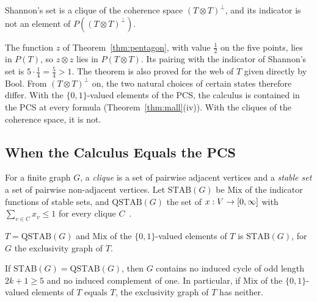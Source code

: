 \begin{theorem}
\label{thm:shannon}
Shannon's set is a clique of the coherence space $(T \otimes T)^{\perp}$,
and its indicator is not an element of $P((T \otimes T)^{\perp})$.
\end{theorem}

\noindent
The function $z$ of Theorem~\ref{thm:pentagon}, with value $\tfrac12$ on
the five points, lies in $P(T)$, so $z \otimes z$ lies in
$P(T \otimes T)$. Its pairing with the indicator of Shannon's set is
$5 \cdot \tfrac14 = \tfrac54 > 1$. The theorem is also proved for the web
of $T$ given directly by $\mathrm{Bool}$. From
$(T \otimes T)^{\perp}$ on, the two natural choices of certain states
therefore differ. With the $\{0,1\}$-valued elements of the PCS, the
calculus is contained in the PCS at every formula
(Theorem~\ref{thm:mall}(iv)). With the cliques of the coherence space, it
is not.

\subsection{When the Calculus Equals the PCS}
\label{sec:second-perfect}

For a finite graph $G$, a \emph{clique} is a set of pairwise adjacent
vertices and a \emph{stable set} a set of pairwise non-adjacent
vertices. Let $\mathrm{STAB}(G)$ be $\mathrm{Mix}$ of the indicator
functions of stable sets, and $\mathrm{QSTAB}(G)$ the set of
$x : V \to [0,\infty]$ with $\sum_{v \in C} x_v \le 1$ for every clique
$C$~\cite{gls1988}.

\begin{theorem}
\label{thm:qstab}
$T = \mathrm{QSTAB}(G)$ and $\mathrm{Mix}$ of the $\{0,1\}$-valued
elements of $T$ is $\mathrm{STAB}(G)$, for $G$ the exclusivity graph of
$T$.
\end{theorem}

\begin{theorem}
\label{thm:berge}
If $\mathrm{STAB}(G) = \mathrm{QSTAB}(G)$, then $G$ contains no induced
cycle of odd length $2k+1 \ge 5$ and no induced complement of one. In
particular, if $\mathrm{Mix}$ of the $\{0,1\}$-valued elements of $T$
equals $T$, the exclusivity graph of $T$ has neither.
\end{theorem}

